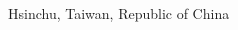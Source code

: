 \documentclass[class=NCU_thesis, crop=false, float=true]{standalone}
\begin{document}
\begin{spacing}{1.0}
\begin{titlepage}
\begin{center}
{        \deptEn 
        \vspace*{10mm} \vfill
        
        \degreedateEn \par
        \vspace*{10mm} \vfill
        
        Hsinchu, Taiwan, Republic of China \par
        \vspace*{10mm} \vfill
        \degreedateROC}
    \end{center}
\end{titlepage}
\end{spacing}
\restoregeometry
\normalfont %
\cleardoublepage
\end{document}
